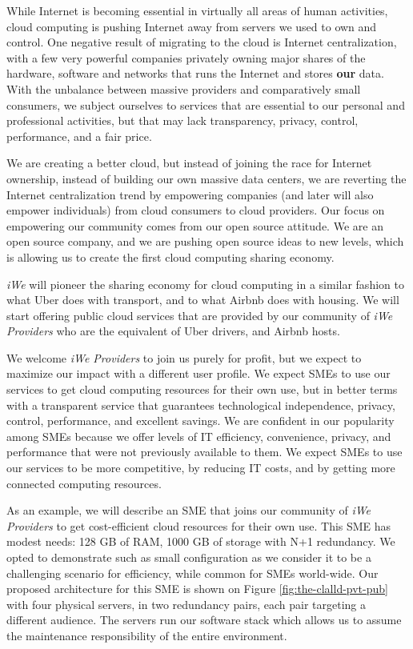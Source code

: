 While Internet is becoming essential in virtually all areas of human activities,
cloud computing is pushing Internet away from servers we used to own and
control. One negative result of migrating to the cloud is Internet
centralization, with a few very powerful companies privately owning major shares
of the hardware, software and networks that runs the Internet and stores
\textbf{our} data. With the unbalance between massive providers and
comparatively small consumers, we subject ourselves to services that are
essential to our personal and professional activities, but that may lack
transparency, privacy, control, performance, and a fair price.

We are creating a better cloud, but instead of joining the race for Internet
ownership, instead of building our own massive data centers, we are reverting
the Internet centralization trend by empowering companies (and later will also
empower individuals) from cloud consumers to cloud providers. Our focus on
empowering our community comes from our open source attitude. We are an open
source company, and we are pushing open source ideas to new levels, which is
allowing us to create the first cloud computing sharing economy.

\textit{iWe} will pioneer the sharing economy for cloud computing in a
similar fashion to what Uber does with transport, and to what Airbnb does with
housing. We will start offering public cloud services that are provided by our
community of \textit{iWe Providers} who are the equivalent of Uber drivers,
and Airbnb hosts.

We welcome \textit{iWe Providers} to join us purely for profit, but we expect
to maximize our impact with a different user profile. We expect SMEs to use our
services to get cloud computing resources for their own use, but in better terms
with a transparent service that guarantees technological independence, privacy,
control, performance, and excellent savings. We are confident in our popularity
among SMEs because we offer levels of IT efficiency, convenience, privacy,
and performance that were not previously available to them. We expect SMEs to
use our services to be more competitive, by reducing IT costs, and by getting
more connected computing resources.

As an example, we will describe an SME that joins our community of
\textit{iWe Providers} to get cost-efficient cloud resources for their own
use. This SME has modest needs: 128 GB of RAM, 1000 GB of storage with N+1
redundancy. We opted to demonstrate such as small configuration as we consider
it to be a challenging scenario for efficiency, while common for SMEs
world-wide. Our proposed architecture for this SME is shown on Figure
\ref{fig:the-clalld-pvt-pub} with four physical servers, in two redundancy
pairs, each pair targeting a different audience. The servers run our software
stack which allows us to assume the maintenance responsibility of the entire
environment.

